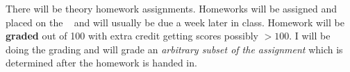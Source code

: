 There will be \numtheoryhws theory homework assignments. Homeworks will be assigned and placed on the \coursewebpagelink~ and will usually be due a week later in class. Homework will be \textbf{graded} out of 100 with extra credit getting scores possibly $> 100$. I will be doing the grading and will grade an \textit{arbitrary subset of the assignment} which is determined after the homework is handed in. 

